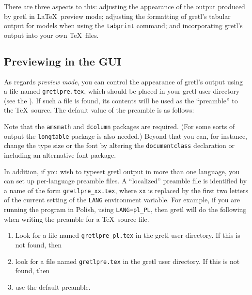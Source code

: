 There are three aspects to this: adjusting the appearance of the
output produced by gretl in \LaTeX\ preview mode; adjusting the
formatting of gretl's tabular output for models when using the
\texttt{tabprint} command; and incorporating gretl's output into
your own \TeX\ files.


\subsection{Previewing in the GUI}

As regards \emph{preview mode}, you can control the appearance of
gretl's output using a file named \verb+gretlpre.tex+, which
should be placed in your gretl user directory (see the \GCR).
If such a file is found, its contents will be used as the ``preamble''
to the \TeX\ source.  The default value of the preamble is as follows:
    

Note that the \verb+amsmath+ and \verb+dcolumn+ packages are required.
(For some sorts of output the \verb+longtable+ package is also
needed.)  Beyond that you can, for instance, change the type size or
the font by altering the \texttt{documentclass} declaration or
including an alternative font package.

In addition, if you wish to typeset gretl output in more than
one language, you can set up per-language preamble files.  A
``localized'' preamble file is identified by a name of the form
\verb|gretlpre_xx.tex|, where \texttt{xx} is replaced by the first two
letters of the current setting of the \texttt{LANG} environment
variable.  For example, if you are running the program in Polish,
using \verb|LANG=pl_PL|, then gretl will do the following when
writing the preamble for a \TeX\ source file.

\begin{enumerate}
\item Look for a file named \verb|gretlpre_pl.tex| in the gretl
  user directory.  If this is not found, then
\item look for a file named \verb|gretlpre.tex| in the gretl
  user directory.  If this is not found, then
\item use the default preamble.
\end{enumerate}

